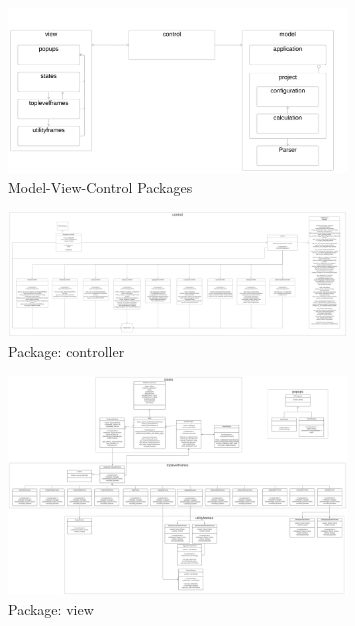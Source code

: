 \documentclass[letterpaper,10pt,english]{sphinxmanual}
\begin{document}
\hypertarget{mvc}{
\begin{figure}[hbt!]
  \centering
\includegraphics[width=0.8\textwidth]
        {pictures/mvc.png}
  \caption{Model-View-Control Packages}
  \label{fig:mvc}
\end{figure}
}

\hypertarget{controller}{
\begin{figure}[hbt!]
  \centering
\includegraphics[width=0.8\textwidth]
        {pictures/controller.png}
  \caption{Package: controller}
  \label{fig:mvc}
\end{figure}
}

\hypertarget{view}{
\begin{figure}[hbt!]
  \centering
\includegraphics[width=0.8\textwidth]
        {pictures/view.png}
  \caption{Package: view}
  \label{fig:mvc}
\end{figure}
}
\end{document}
